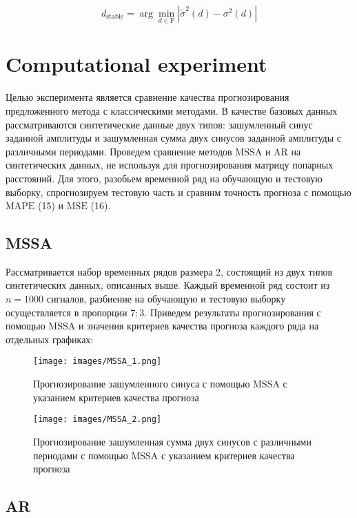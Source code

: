 \documentclass{article}
\begin{document}
\begin{equation}
    d_{\text{stable}} = \arg\min\limits_{d \in \text{F}}|\widetilde{\sigma}^2(d) - \sigma^2(d)|
\end{equation}

\section{Computational experiment}

Целью эксперимента является сравнение качества прогнозирования предложенного метода с классическими методами. В качестве базовых данных рассматриваются синтетические данные двух типов: зашумленный синус заданной амплитуды и зашумленная сумма двух синусов заданной амплитуды с различными периодами. Проведем сравнение методов $\text{MSSA}$ и $\text{AR}$ на синтетических данных, не используя для прогнозирования матрицу попарных расстояний. Для этого, разобьем временной ряд на обучающую и тестовую выборку, спрогнозируем тестовую часть и сравним точность прогноза с помощью $\text{MAPE}$ (15) и $\text{MSE}$ (16).

\subsection{MSSA}

Рассматривается набор временных рядов размера 2, состоящий из двух типов синтетических данных, описанных выше. Каждый временной ряд состоит из $n = 1000$ сигналов, разбиение на обучающую и тестовую выборку осуществляется в пропорции $7:3$. Приведем результаты прогнозирования с помощью MSSA и значения критериев качества прогноза каждого ряда на отдельных графиках:

\begin{figure}[!htbp]
\centering
{\texttt{[image: images/MSSA\_1.png]} }
\caption{Прогнозирование зашумленного синуса с помощью MSSA с указанием критериев качества прогноза}
\label{fig:MSSAsine}
\end{figure}

\begin{figure}[!htbp]
\centering
{\texttt{[image: images/MSSA\_2.png]} }
\caption{Прогнозирование зашумленная сумма двух синусов с различными периодами с помощью MSSA с указанием критериев качества прогноза}
\label{fig:MSSA2sines}
\end{figure}

\newpage

\subsection{AR}
\end{document}
